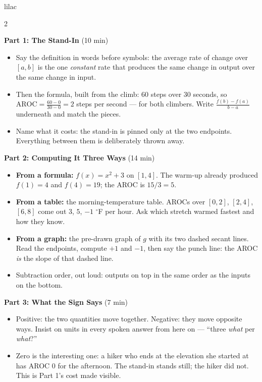 \documentclass[10pt]{article}
\begin{document}
\begin{skillbox}[Lesson]{lilac}
\begin{multicols}{2}

\textbf{Part 1: The Stand-In} (10 min)

\begin{itemize}
  \item Say the definition in words before symbols: the average rate of change
        over $[a,b]$ is the one \textit{constant} rate that produces the same
        change in output over the same change in input.
  \item Then the formula, built from the climb: $60$ steps over $30$ seconds,
        so $\text{AROC} = \frac{60-0}{30-0} = 2$ steps per second --- for both
        climbers. Write $\frac{f(b)-f(a)}{b-a}$ underneath and match the pieces.
  \item Name what it costs: the stand-in is pinned only at the two endpoints.
        Everything between them is deliberately thrown away.
\end{itemize}

\textbf{Part 2: Computing It Three Ways} (14 min)

\begin{itemize}
  \item \textbf{From a formula:} $f(x) = x^2 + 3$ on $[1,4]$. The warm-up
        already produced $f(1)=4$ and $f(4)=19$; the AROC is $15/3 = 5$.
  \item \textbf{From a table:} the morning-temperature table. AROCs over
        $[0,2]$, $[2,4]$, $[6,8]$ come out $3$, $5$, $-1$ $^\circ$F per hour.
        Ask which stretch warmed fastest and how they know.
  \item \textbf{From a graph:} the pre-drawn graph of $g$ with its two dashed
        secant lines. Read the endpoints, compute $+1$ and $-1$, then say the
        punch line: the AROC \textit{is} the slope of that dashed line.
  \item Subtraction order, out loud: outputs on top in the same order as the
        inputs on the bottom.
\end{itemize}

\columnbreak

\textbf{Part 3: What the Sign Says} (7 min)

\begin{itemize}
  \item Positive: the two quantities move together. Negative: they move
        opposite ways. Insist on units in every spoken answer from here on ---
        ``three \textit{what} per \textit{what}?''
  \item Zero is the interesting one: a hiker who ends at the elevation she
        started at has AROC $0$ for the afternoon. The stand-in stands still;
        the hiker did not. This is Part 1's cost made visible.
\end{itemize}


\end{multicols}
\end{skillbox}
\end{document}
